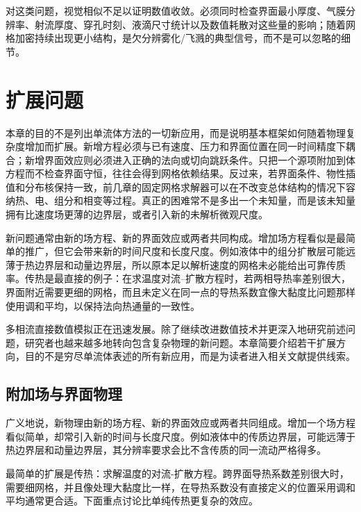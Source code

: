 \documentclass[11pt,a4paper,openany,fontset=none]{ctexbook}
\begin{document}
对这类问题，视觉相似不足以证明数值收敛。必须同时检查界面最小厚度、气膜分辨率、射流厚度、穿孔时刻、液滴尺寸统计以及数值耗散对这些量的影响；随着网格加密持续出现更小结构，是欠分辨雾化/飞溅的典型信号，而不是可以忽略的细节。


\chapter{扩展问题}
本章的目的不是列出单流体方法的一切新应用，而是说明基本框架如何随着物理复杂度增加而扩展。新增方程必须与已有速度、压力和界面位置在同一时间精度下耦合；新增界面效应则必须进入正确的法向或切向跳跃条件。只把一个源项附加到体方程而不检查界面守恒，往往会得到网格依赖结果。反过来，若界面条件、物性插值和分布核保持一致，前几章的固定网格求解器可以在不改变总体结构的情况下容纳热、电、组分和相变等过程。真正的困难常不是多出一个未知量，而是该未知量拥有比速度场更薄的边界层，或者引入新的未解析微观尺度。

新问题通常由新的场方程、新的界面效应或两者共同构成。增加场方程看似是最简单的推广，但它会带来新的时间尺度和长度尺度。例如液体中的组分扩散层可能远薄于热边界层和动量边界层，所以原本足以解析速度的网格未必能给出可靠传质率。传热是最直接的例子：在求温度对流--扩散方程时，若两相导热率差别很大，界面附近需要更细的网格，而且未定义在同一点的导热系数宜像大黏度比问题那样使用调和平均，以保持法向热通量的一致性。


多相流直接数值模拟正在迅速发展。除了继续改进数值技术并更深入地研究前述问题，研究者也越来越多地转向包含复杂物理的新问题。本章简要介绍若干扩展方向，目的不是穷尽单流体表述的所有新应用，而是为读者进入相关文献提供线索。

\section{附加场与界面物理}

广义地说，新物理由新的场方程、新的界面效应或两者共同组成。增加一个场方程看似简单，却常引入新的时间与长度尺度。例如液体中的传质边界层，可能远薄于热边界层和动量边界层，其分辨率要求会比不含传质的同一流动严格得多。

最简单的扩展是传热：求解温度的对流-扩散方程。跨界面导热系数差别很大时，需要细网格，并且像处理大黏度比一样，在导热系数没有直接定义的位置采用调和平均通常更合适。下面重点讨论比单纯传热更复杂的效应。
\end{document}
